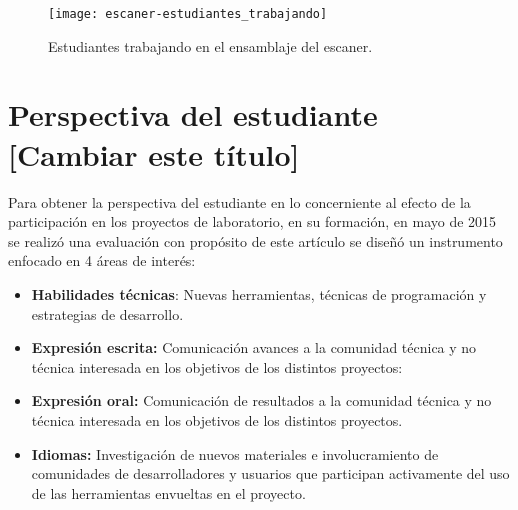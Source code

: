 \documentclass[conference]{IEEEtran}
\begin{document}
\begin{figure}[!t]
\centering
\texttt{[image: escaner-estudiantes\_trabajando]}
\caption{Estudiantes trabajando en el ensamblaje del escaner.}
\label{escaner}
\end{figure}


\section{Perspectiva del estudiante \textbf{[Cambiar este título]} }

Para obtener la perspectiva del estudiante en lo concerniente al efecto de la
participación en los proyectos de laboratorio, en su formación, en mayo de 2015
se realizó una evaluación con propósito de este artículo se diseñó un
instrumento enfocado en 4 áreas de interés: 

\begin{itemize}
    \item \textbf{Habilidades técnicas}: Nuevas herramientas, técnicas de
        programación y estrategias de desarrollo.

    \item \textbf{Expresión escrita:} Comunicación avances a la comunidad
        técnica y no técnica interesada en los objetivos de los distintos
        proyectos:

    \item \textbf{Expresión oral:} Comunicación de resultados a la comunidad
        técnica y no técnica interesada en los objetivos de los distintos
        proyectos. 

    \item \textbf{Idiomas:} Investigación de nuevos materiales e involucramiento
        de comunidades de desarrolladores y usuarios que participan activamente
        del uso de las herramientas envueltas en el proyecto.
\end{itemize}
\end{document}
